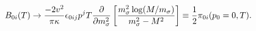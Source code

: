 \begin{equation}
B_{0i}(T) \rightarrow \frac{-2 v^2}{\pi \kappa} \epsilon_{0ij} p^j T
 \frac{\partial}{\partial m_{\sigma}^2}\left[\frac{m_{\sigma}^2
 \log(M/m_{\sigma})}{m_{\sigma}^2 - M^2}\right] \equiv \frac{1}{2}
 {\cal{\pi}}_{0i} (p_0=0,T).
\end{equation}

